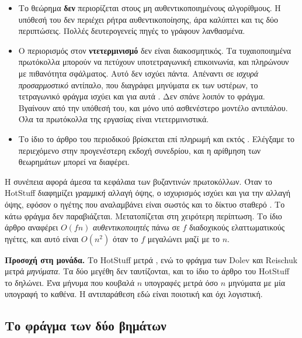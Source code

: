 \begin{itemize}
  \item Το θεώρημα \textbf{δεν} περιορίζεται στους μη
  αυθεντικοποιημένους αλγορίθμους. Η υπόθεσή του δεν περιέχει ρήτρα
  αυθεντικοποίησης, άρα καλύπτει και τις δύο περιπτώσεις. Πολλές
  δευτερογενείς πηγές το γράφουν λανθασμένα.
  \item Ο περιορισμός στον \textbf{ντετερμινισμό} δεν είναι
  διακοσμητικός. Τα τυχαιοποιημένα πρωτόκολλα μπορούν να πετύχουν
  υποτετραγωνική επικοινωνία, και πληρώνουν με πιθανότητα σφάλματος.
  Αυτό δεν ισχύει πάντα. Απέναντι σε \emph{ισχυρά προσαρμοστικό}
  αντίπαλο, που διαγράφει μηνύματα εκ των υστέρων, το τετραγωνικό φράγμα
  ισχύει και για αυτά \cite{abraham2019ccba}. Δεν σπάνε λοιπόν το
  φράγμα. Βγαίνουν από την υπόθεσή του, και μόνο υπό ασθενέστερο μοντέλο
  αντιπάλου. Όλα τα πρωτόκολλα της εργασίας είναι ντετερμινιστικά.
  \item Το ίδιο το άρθρο του περιοδικού βρίσκεται επί πληρωμή και εκτός
  . Ελέγξαμε το περιεχόμενο στην προγενέστερη εκδοχή
  συνεδρίου, και η αρίθμηση των θεωρημάτων μπορεί να διαφέρει.
\end{itemize}

Η συνέπεια αφορά άμεσα τα κεφάλαια των βυζαντινών πρωτοκόλλων. Όταν το
HotStuff διαφημίζει \emph{γραμμική} αλλαγή όψης, ο ισχυρισμός ισχύει και
για την αλλαγή όψης, εφόσον ο ηγέτης που αναλαμβάνει είναι σωστός και το
δίκτυο σταθερό \cite{yin2019hotstuff}. Το κάτω φράγμα δεν παραβιάζεται.
Μετατοπίζεται στη χειρότερη περίπτωση. Το ίδιο άρθρο αναφέρει $O(fn)$
\emph{αυθεντικοποιητές} πάνω σε $f$ διαδοχικούς ελαττωματικούς ηγέτες,
και αυτό είναι $O(n^{2})$ όταν το $f$ μεγαλώνει μαζί με το $n$.

\textbf{Προσοχή στη μονάδα.} Το HotStuff μετρά , ενώ
το φράγμα των Dolev και Reischuk μετρά \emph{μηνύματα}. Τα δύο μεγέθη
δεν ταυτίζονται, και το ίδιο το άρθρο του HotStuff το δηλώνει. Ένα
μήνυμα που κουβαλά $n$ υπογραφές μετρά όσο $n$ μηνύματα με μία υπογραφή
το καθένα. Η αντιπαράθεση εδώ είναι ποιοτική και όχι λογιστική.

\subsection{Το φράγμα των δύο βημάτων}

